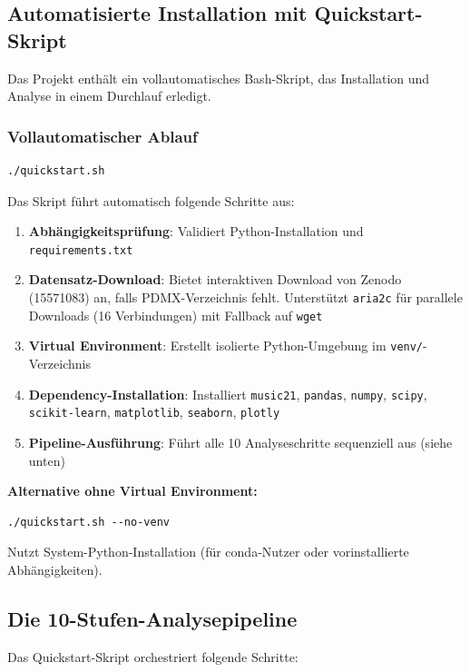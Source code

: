 \documentclass[10pt,a4paper]{article}
\theoremstyle{definition}
\begin{document}
\subsection{Automatisierte Installation mit Quickstart-Skript}

Das Projekt enthält ein vollautomatisches Bash-Skript, das Installation und Analyse in einem Durchlauf erledigt.

\subsubsection{Vollautomatischer Ablauf}

\begin{lstlisting}
./quickstart.sh
\end{lstlisting}

Das Skript führt automatisch folgende Schritte aus:
\begin{enumerate}
    \item \textbf{Abhängigkeitsprüfung}: Validiert Python-Installation und \texttt{requirements.txt}
    \item \textbf{Datensatz-Download}: Bietet interaktiven Download von Zenodo (15571083) an, falls PDMX-Verzeichnis fehlt. Unterstützt \texttt{aria2c} für parallele Downloads (16 Verbindungen) mit Fallback auf \texttt{wget}
    \item \textbf{Virtual Environment}: Erstellt isolierte Python-Umgebung im \texttt{venv/}-Verzeichnis
    \item \textbf{Dependency-Installation}: Installiert \texttt{music21}, \texttt{pandas}, \texttt{numpy}, \texttt{scipy}, \texttt{scikit-learn}, \texttt{matplotlib}, \texttt{seaborn}, \texttt{plotly}
    \item \textbf{Pipeline-Ausführung}: Führt alle 10 Analyseschritte sequenziell aus (siehe unten)
\end{enumerate}

\textbf{Alternative ohne Virtual Environment:}
\begin{lstlisting}
./quickstart.sh --no-venv
\end{lstlisting}
Nutzt System-Python-Installation (für conda-Nutzer oder vorinstallierte Abhängigkeiten).

\subsection{Die 10-Stufen-Analysepipeline}

Das Quickstart-Skript orchestriert folgende Schritte:
\end{document}
